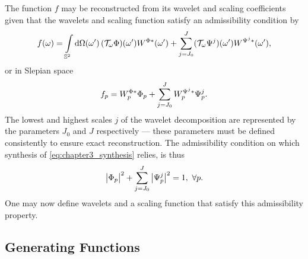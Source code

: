 The function \(f\) may be reconstructed from its wavelet and scaling coefficients given that the wavelets and scaling function satisfy an admissibility condition by
%
\begin{equation}\label{eq:chapter3_synthesis}
	\pixel{f}
	= \integrateSphere{\omega'}
	\pixel[']{(\translation{\omega}\Phi)} \pixel[']{W^{\Phi\ast}}
	+ \waveletSum \pixel[']{(\translation{\omega}\Psi^{j})} \pixel[']{W^{\Psi^{j}\ast}},
\end{equation}
%
or in Slepian space
%
\begin{equation}
	\slepian{f}
	= \slepian{W}^{\Phi\ast} \slepian{\Phi}
	+ \waveletSum \slepian{W}^{\Psi^{j}\ast} \slepian{\Psi}^{j}.
\end{equation}
%
The lowest and highest scales \(j\) of the wavelet decomposition are represented by the parameters \(J_{0}\) and \(J\) respectively --- these parameters must be defined consistently to ensure exact reconstruction.
The admissibility condition on which synthesis of \cref{eq:chapter3_synthesis} relies, is thus
%
\begin{equation}\label{eq:chapter3_admissibility}
	\abs{\slepian{\Phi}}^{2}
	+ \waveletSum \abs{\slepian{\Psi}^{j}}^{2}
	= 1,\ \forall p.
\end{equation}
%
One may now define wavelets and a scaling function that satisfy this admissibility property.

\subsection{Generating Functions}\label{sec:chapter3_generating_functions}

